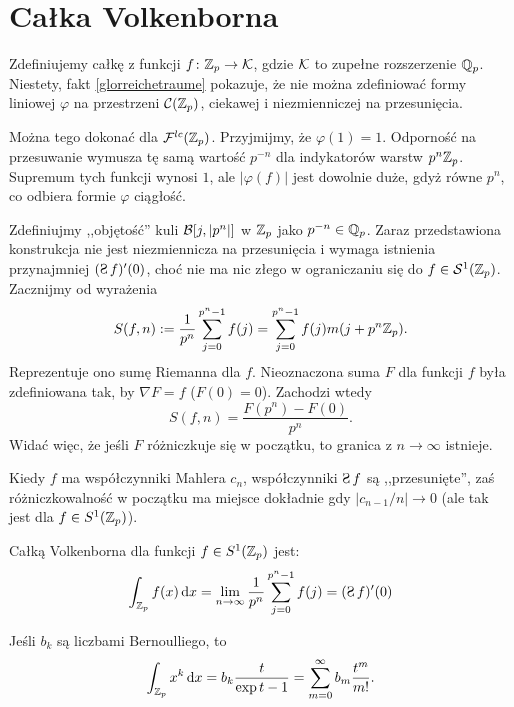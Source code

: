 \section{Całka Volkenborna}
Zdefiniujemy całkę z funkcji $f \colon \mathbb Z_p \to \mathcal K$, gdzie $\mathcal K$ to zupełne rozszerzenie $\mathbb Q_p$.
Niestety, fakt \ref{glorreichetraume} pokazuje, że nie można zdefiniować formy liniowej $\varphi$ na przestrzeni $\mathcal C(\mathbb Z_p)$, ciekawej i  niezmienniczej na przesunięcia. %

Można tego dokonać dla $\mathcal F^{lc}(\mathbb Z_p)$.
Przyjmijmy, że $\varphi(1) = 1$.
Odporność na przesuwanie wymusza tę samą wartość $p^{-n}$ dla indykatorów warstw $p^n \mathbb Z_p$.
Supremum tych funkcji wynosi $1$, ale $|\varphi(f)|$ jest dowolnie duże, gdyż równe $p^n$, co odbiera formie $\varphi$ ciągłość.

Zdefiniujmy ,,objętość'' kuli $\mathcal B[j, |p^n|]$ w $\mathbb Z_p$ jako $p^{-n} \in \mathbb Q_p$.
Zaraz przedstawiona konstrukcja nie jest niezmiennicza na przesunięcia i wymaga istnienia przynajmniej $(\suma f)'(0)$, choć nie ma nic złego w ograniczaniu się do $f \in \mathcal S^1(\mathbb Z_p)$.
Zacznijmy od wyrażenia
\[
	S(f, n) := \frac{1}{p^n}\sum_{j=0}^{p^n-1} f(j) = \sum_{j=0}^{p^n-1} f(j) m(j+p^n\mathbb Z_p).
\]
Reprezentuje ono sumę Riemanna dla $f$.
Nieoznaczona suma $F$ dla funkcji $f$ była zdefiniowana tak, by $\nabla F = f$ ($F(0) = 0$).
Zachodzi wtedy
\[
	S(f, n) = \frac{F(p^n) - F(0)}{p^n}.
\]
Widać więc, że jeśli $F$ różniczkuje się w początku, to granica z $n \to \infty$ istnieje.

Kiedy $f$ ma współczynniki Mahlera $c_n$, współczynniki $\suma f$ są ,,przesunięte'', zaś różniczkowalność w początku ma miejsce dokładnie gdy $|c_{n-1}/n| \to 0$ (ale tak jest dla $f \in S^1(\mathbb Z_p)$). %

\begin{definicja}
{Całką Volkenborna} dla funkcji $f \in S^1(\mathbb Z_p)$ jest:
\[
	\int_{\Z_p} f(x) \,\textrm{d}x = \lim_{n\to \infty} \frac{1}{p^n} \sum_{j=0}^{p^n-1} f(j) = (\suma f)'(0)
\]
\end{definicja}

\begin{przyklad}
	Jeśli $b_k$ są liczbami Bernoulliego, to
	\[
		\intzp x^k \,\textrm{d}x = b_k \hfill \frac{t}{\exp t - 1} = \sum_{m = 0}^\infty b_m \frac{t^m}{m!}.
	\]
\end{przyklad}

